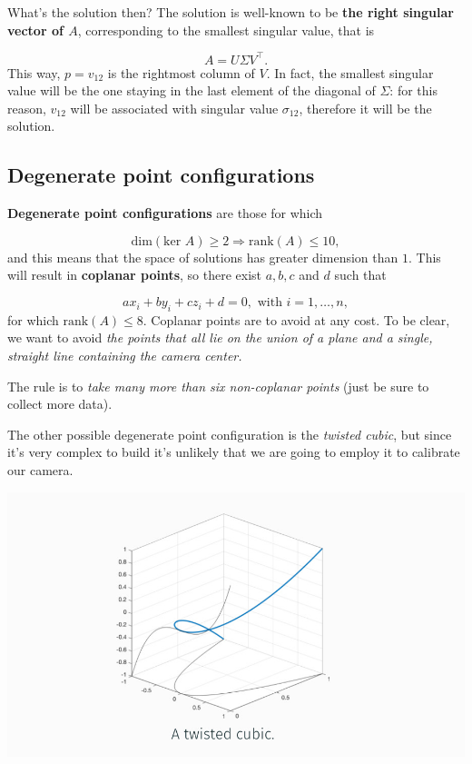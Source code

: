 \documentclass[10pt]{report}
\begin{document}
What's the solution then? The solution is well-known to be \textbf{the right singular vector of \(A\)},
corresponding to the smallest singular value, that is

\[ A = U\Sigma V^\top.\] This way, \(p=v_{12}\) is the rightmost column
of \(V\). In fact, the smallest singular value will be the one staying
in the last element of the diagonal of \(\Sigma\): for this reason,
\(v_{12}\) will be associated with singular value \(\sigma_{12}\),
therefore it will be the solution.

\subsection{Degenerate point configurations}
\label{degenerate-point-configurations}
\textbf{Degenerate point configurations} are those for which

\[ \mbox{dim}( \mbox{ker } A) \geq 2 \Rightarrow \mbox{rank}(A) \leq 10,\]
and this means that the space of solutions has greater dimension than
\(1\). This will result in \textbf{coplanar points}, so there exist \(a, b, c\)
and \(d\) such that

\[a x_ i + by_ i + cz_ i + d = 0, \mbox{ with } i=1,\dots,n,\] for which
\(\mbox{rank}(A) \leq 8\). Coplanar points are to avoid at any
cost. To be clear, we want to avoid \emph{the points that all lie on the union of a
plane and a single, straight line containing the camera center.}

The rule is to \emph{take many more than six non-coplanar points} (just be
sure to collect more data).

The other possible degenerate point configuration is the \emph{twisted
cubic}, but since it's very complex to build it's unlikely that we are
going to employ it to calibrate our camera.

\begin{center}
\includegraphics[width=.9\linewidth]{./pics/cal/twisted-cubic.jpg}
\end{center}
\end{document}
